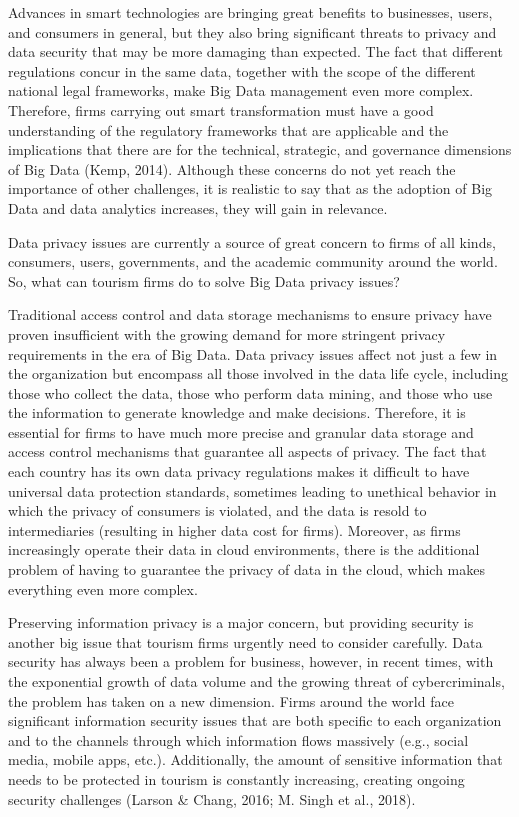\documentclass[
  letterpaper,
  DIV=11,
  numbers=noendperiod]{scrreprt}
\begin{document}
Advances in smart technologies are bringing great benefits to
businesses, users, and consumers in general, but they also bring
significant threats to privacy and data security that may be more
damaging than expected. The fact that different regulations concur in
the same data, together with the scope of the different national legal
frameworks, make Big Data management even more complex. Therefore, firms
carrying out smart transformation must have a good understanding of the
regulatory frameworks that are applicable and the implications that
there are for the technical, strategic, and governance dimensions of Big
Data (Kemp, 2014). Although these concerns do not yet reach the
importance of other challenges, it is realistic to say that as the
adoption of Big Data and data analytics increases, they will gain in
relevance.

Data privacy issues are currently a source of great concern to firms of
all kinds, consumers, users, governments, and the academic community
around the world. So, what can tourism firms do to solve Big Data
privacy issues?

Traditional access control and data storage mechanisms to ensure privacy
have proven insufficient with the growing demand for more stringent
privacy requirements in the era of Big Data. Data privacy issues affect
not just a few in the organization but encompass all those involved in
the data life cycle, including those who collect the data, those who
perform data mining, and those who use the information to generate
knowledge and make decisions. Therefore, it is essential for firms to
have much more precise and granular data storage and access control
mechanisms that guarantee all aspects of privacy. The fact that each
country has its own data privacy regulations makes it difficult to have
universal data protection standards, sometimes leading to unethical
behavior in which the privacy of consumers is violated, and the data is
resold to intermediaries (resulting in higher data cost for firms).
Moreover, as firms increasingly operate their data in cloud
environments, there is the additional problem of having to guarantee the
privacy of data in the cloud, which makes everything even more complex.

Preserving information privacy is a major concern, but providing
security is another big issue that tourism firms urgently need to
consider carefully. Data security has always been a problem for
business, however, in recent times, with the exponential growth of data
volume and the growing threat of cybercriminals, the problem has taken
on a new dimension. Firms around the world face significant information
security issues that are both specific to each organization and to the
channels through which information flows massively (e.g., social media,
mobile apps, etc.). Additionally, the amount of sensitive information
that needs to be protected in tourism is constantly increasing, creating
ongoing security challenges (Larson \& Chang, 2016; M. Singh et al.,
2018).
\end{document}
